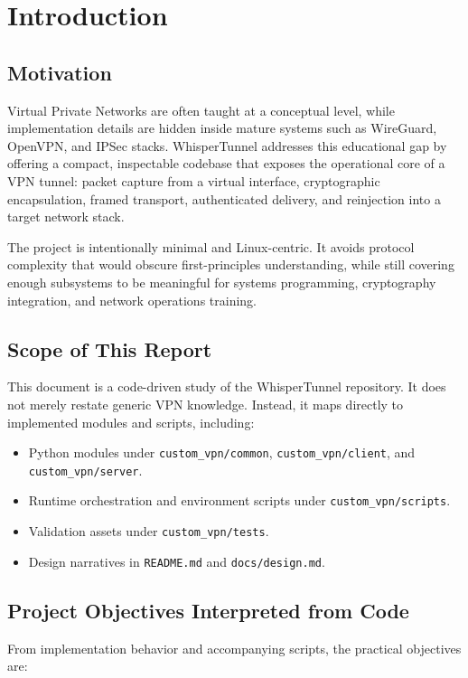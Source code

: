 \chapter{Introduction}

\section{Motivation}
Virtual Private Networks are often taught at a conceptual level, while implementation details are hidden inside mature systems such as WireGuard, OpenVPN, and IPSec stacks. WhisperTunnel addresses this educational gap by offering a compact, inspectable codebase that exposes the operational core of a VPN tunnel: packet capture from a virtual interface, cryptographic encapsulation, framed transport, authenticated delivery, and reinjection into a target network stack.

The project is intentionally minimal and Linux-centric. It avoids protocol complexity that would obscure first-principles understanding, while still covering enough subsystems to be meaningful for systems programming, cryptography integration, and network operations training.

\section{Scope of This Report}
This document is a code-driven study of the WhisperTunnel repository. It does not merely restate generic VPN knowledge. Instead, it maps directly to implemented modules and scripts, including:

\begin{itemize}[leftmargin=2em]
\item Python modules under \texttt{custom\_vpn/common}, \texttt{custom\_vpn/client}, and \texttt{custom\_vpn/server}.
\item Runtime orchestration and environment scripts under \texttt{custom\_vpn/scripts}.
\item Validation assets under \texttt{custom\_vpn/tests}.
\item Design narratives in \texttt{README.md} and \texttt{docs/design.md}.
\end{itemize}

\section{Project Objectives Interpreted from Code}
From implementation behavior and accompanying scripts, the practical objectives are:

